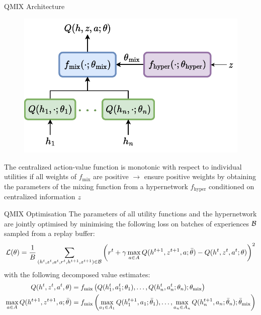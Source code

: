 \begin{frame}[t]{QMIX Architecture}
    \begin{figure}[h]
        \centering
        \includegraphics[width=.5\textwidth]{images/chapter_9/qmix_architecture.pdf}
    \end{figure}

    \vspace{-1em}

    The centralized action-value function is monotonic with respect to individual utilities if all weights of $f_{\text{mix}}$ are positive $\rightarrow$ ensure positive weights by obtaining the parameters of the mixing function from a hypernetwork $f_{\text{hyper}}$ conditioned on centralized information $z$

\end{frame}

\begin{frame}[t]{QMIX Optimisation}
    The parameters of all utility functions and the hypernetwork are jointly optimised by minimising the following loss on batches of experiences $\mathcal{B}$ sampled from a replay buffer:
    \begin{equation*}
        \mathcal{L}(\theta) = \frac{1}{B} \sum_{(h^t, z^t, a^t, r^t, h^{t+1}, z^{t+1}) \in \mathcal{B}} \left(r^t + \gamma \max_{a\in A}{Q(h^{t+1}, z^{t+1}, a; \bar\theta)} - Q(h^t, z^t, a^t; \theta)\right)^2
    \end{equation*}
    with the following decomposed value estimates:
    \begin{align*}
        Q(h^t, z^t, a^t, \theta) &= f_{\text{mix}}\left(Q(h^t_1, a^t_1; \theta_1), \ldots, Q(h^t_n, a^t_n; \theta_n); \theta_{\text{mix}}\right)\\
        \max_{a\in A}{Q(h^{t+1}, z^{t+1}, a; \bar\theta)} &= f_{\text{mix}}\left(\max_{a_1\in A_1} Q(h^{t+1}_1, a_1; \bar\theta_1), \ldots, \max_{a_n\in A_n} Q(h^{t+1}_n, a_n; \bar\theta_n); \bar\theta_{\text{mix}}\right)
    \end{align*}
\end{frame}

